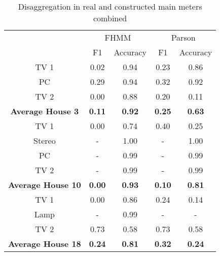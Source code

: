 \begin{table}[H]                             
\centering                                   
\begin{tabular}{|c|c|c|c|c|}                 
\cline{2-5}                                      
\multicolumn{1}{c|}{} & \multicolumn{2}{|c|}{FHMM} & \multicolumn{2}{c|}{Parson} \\                      
\cline{2-5}                                        
\multicolumn{1}{c|}{} & F1 & Accuracy & F1 & Accuracy \\          
\hline                                            
TV 1 & 0.02 & 0.94 & 0.23 & 0.86 \\          
\hline                                       
PC & 0.29 & 0.94 & 0.32 & 0.92 \\            
\hline                                       
TV 2 & 0.00 & 0.88 & 0.20 & 0.11 \\          
\hline                                       
\textbf{Average House 3} & \textbf{0.11} & \textbf{0.92} & \textbf{0.25} & \textbf{0.63} \\ 
\hline                                       
TV 1 & 0.00 & 0.74 & 0.40 & 0.25 \\          
\hline                                       
Stereo & - & 1.00 & - & 1.00 \\              
\hline                                       
PC & - & 0.99 & - & 0.99 \\                  
\hline                                       
TV 2 & - & 0.99 & - & 0.99 \\                
\hline                                       
\textbf{Average House 10} & \textbf{0.00} & \textbf{0.93} & \textbf{0.10} & \textbf{0.81} \\
\hline                                       
TV 1 & 0.00 & 0.86 & 0.24 & 0.14 \\          
\hline                                       
Lamp & - & 0.99 & - & - \\                   
\hline                                       
TV 2 & 0.73 & 0.58 & 0.73 & 0.58 \\          
\hline                                       
\textbf{Average House 18} & \textbf{0.24} & \textbf{0.81} & \textbf{0.32} & \textbf{0.24} \\
\hline                                       
\end{tabular}                                
\caption{Disaggregation in real and constructed main meters combined}                     
\label{table:Tab:SHGREALSIM}                 
\end{table}    
